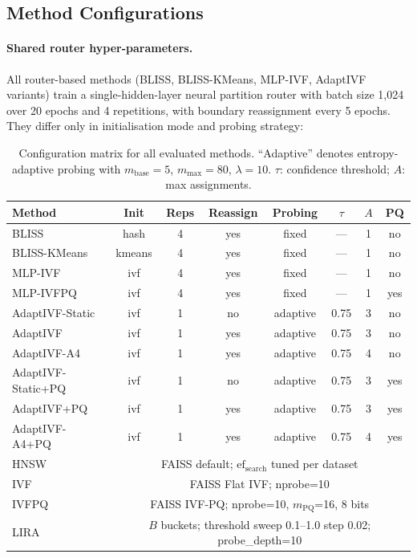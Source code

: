 \subsection{Method Configurations}
\label{sec:appendix:configs}

\paragraph{Shared router hyper-parameters.}
All router-based methods (BLISS, BLISS-KMeans, MLP-IVF, AdaptIVF variants)
train a single-hidden-layer neural partition router with batch size 1{,}024
over 20 epochs and 4 repetitions, with boundary reassignment every 5 epochs.
They differ only in initialisation mode and probing strategy:

\begin{table}[h]
\centering
\caption{Configuration matrix for all evaluated methods.  ``Adaptive'' denotes
entropy-adaptive probing with $m_{\text{base}}\!=\!5$, $m_{\max}\!=\!80$,
$\lambda\!=\!10$.  $\tau$: confidence threshold; $A$: max assignments.}
\label{tab:appendix:configs}
\small
\begin{tabular}{lccccccc}
\toprule
Method & Init & Reps & Reassign & Probing & $\tau$ & $A$ & PQ \\
\midrule
BLISS            & hash   & 4 & yes & fixed    & ---  & 1 & no  \\
BLISS-KMeans     & kmeans & 4 & yes & fixed    & ---  & 1 & no  \\
MLP-IVF          & ivf    & 4 & yes & fixed    & ---  & 1 & no  \\
MLP-IVFPQ        & ivf    & 4 & yes & fixed    & ---  & 1 & yes \\
AdaptIVF-Static  & ivf    & 1 & no  & adaptive & 0.75 & 3 & no  \\
AdaptIVF         & ivf    & 1 & yes & adaptive & 0.75 & 3 & no  \\
AdaptIVF-A4      & ivf    & 1 & yes & adaptive & 0.75 & 4 & no  \\
AdaptIVF-Static+PQ & ivf  & 1 & no  & adaptive & 0.75 & 3 & yes \\
AdaptIVF+PQ      & ivf    & 1 & yes & adaptive & 0.75 & 3 & yes \\
AdaptIVF-A4+PQ   & ivf    & 1 & yes & adaptive & 0.75 & 4 & yes \\
\midrule
HNSW             & \multicolumn{7}{c}{FAISS default; $\text{ef}_{\text{search}}$ tuned per dataset} \\
IVF              & \multicolumn{7}{c}{FAISS Flat IVF; nprobe=10} \\
IVFPQ            & \multicolumn{7}{c}{FAISS IVF-PQ; nprobe=10, $m_{\text{PQ}}$=16, 8 bits} \\
LIRA             & \multicolumn{7}{c}{$B$ buckets; threshold sweep 0.1--1.0 step 0.02; probe\_depth=10} \\
\bottomrule
\end{tabular}
\end{table}

